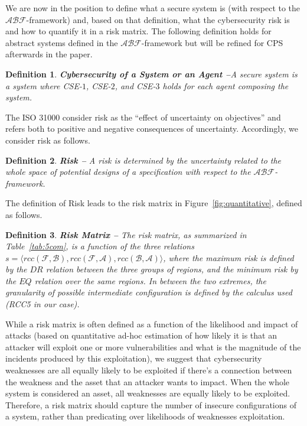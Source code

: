 \documentclass[conference]{IEEEtran}
\newcommand{\assertionRegion}{\mathcal{A}}
\newcommand{\beliefRegion}{\mathcal{B}}
\newcommand{\factRegion}{\mathcal{F}}
\newcommand{\rcc}{rcc}
\newcommand{\abftheory}{\assertionRegion\beliefRegion\factRegion}
\newtheorem{definition}{Definition}%
\begin{document}
We are now in the position to define what a secure system is (with respect to
the $\abftheory$-framework) and, based on that definition, what the cybersecurity risk is and
how to quantify it in a risk matrix. The following definition holds for 
abstract systems defined in the $\abftheory$-framework but will be refined
for CPS afterwards in the paper.
\begin{definition}{\bf Cybersecurity of a System or an Agent --}\label{def:security}
	A secure system is a system where CSE-$1$, CSE-$2$, and CSE-$3$ holds for
	each agent composing the system.
\end{definition}
The ISO 31000 consider risk as the ``effect of uncertainty on objectives'' and
refers both to positive and negative consequences of uncertainty.
Accordingly, we consider risk as follows. 
\begin{definition}{\bf Risk --}
A risk is determined by the uncertainty related to the whole space of potential designs of a specification with respect to the
	$\abftheory$-framework.
\end{definition}
The definition of Risk leads to the risk matrix in
Figure~\ref{fig:quantitative}, defined as follows.
\begin{definition}{\bf Risk Matrix --}
	The risk matrix, as summarized in Table~\ref{tab:5com}, is a function of the three relations
	$s=\langle\rcc(\factRegion,\beliefRegion),\rcc(\factRegion,\assertionRegion),\rcc(\beliefRegion,\assertionRegion)\rangle$,
	where the maximum risk is defined by the $DR$ relation between the
	three groups of regions, and the minimum risk by the $EQ$ relation over
	the same regions. In between the two extremes, the granularity of
	possible intermediate configuration is defined by the calculus used
	(RCC5 in our case).
\end{definition}
While a risk matrix is often defined as a function of the likelihood and impact
of attacks (based on quantitative ad-hoc estimation of how likely it is that an
attacker will exploit one or more vulnerabilities and what is the magnitude of
the incidents produced by this exploitation), we suggest that cybersecurity
weaknesses are all equally likely to be exploited if there's a connection
between the weakness and the asset that an attacker wants to impact. When the
whole system is considered an asset, all weaknesses are equally likely to be
exploited.  Therefore, a risk matrix should capture the number of insecure
configurations of a system, rather than predicating over likelihoods of
weaknesses exploitation.
\end{document}

